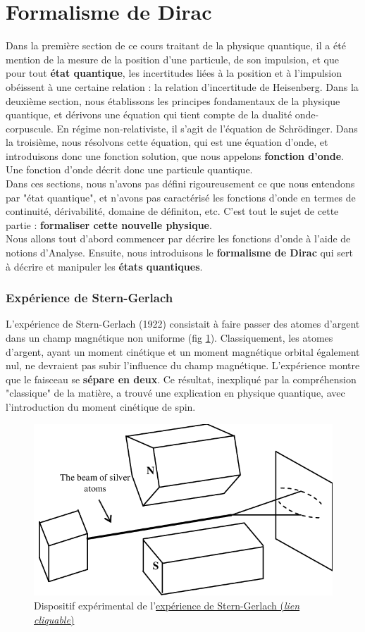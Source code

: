 \documentclass[../notesdecours.tex]{subfiles}
\begin{document}
\part{Formalisme de Dirac} \label{Formalisme de Dirac}
Dans la première section de ce cours traitant de la physique quantique, il a été mention de la mesure de la position d'une particule, de son impulsion, et que pour tout \textbf{état quantique}, les incertitudes liées à la position et à l'impulsion obéissent à une certaine relation : la relation d'incertitude de Heisenberg. Dans la deuxième section, nous établissons les principes fondamentaux de la physique quantique, et dérivons une équation qui tient compte de la dualité onde-corpuscule. En régime non-relativiste, il s'agit de l'équation de Schrödinger. Dans la troisième, nous résolvons cette équation, qui est une équation d'onde, et introduisons donc une fonction solution, que nous appelons \textbf{fonction d'onde}. Une fonction d'onde décrit donc une particule quantique. \\

Dans ces sections, nous n'avons pas défini rigoureusement ce que nous entendons par "état quantique", et n'avons pas caractérisé les fonctions d'onde en termes de continuité, dérivabilité, domaine de définiton, etc. C'est tout le sujet de cette partie : \textbf{formaliser cette nouvelle physique}. \\

Nous allons tout d'abord commencer par décrire les fonctions d'onde à l'aide de notions d'Analyse. Ensuite, nous introduisons le \textbf{formalisme de Dirac} qui sert à décrire et manipuler les \textbf{états quantiques}.
\section{Expérience de Stern-Gerlach}
L'expérience de Stern-Gerlach (1922) consistait à faire passer des atomes d'argent dans un champ magnétique non uniforme (fig \ref{fig:chap4-sterngerlach}). Classiquement, les atomes d'argent, ayant un moment cinétique et un moment magnétique orbital également nul, ne devraient pas subir l'influence du champ magnétique. L'expérience montre que le faisceau se \textbf{sépare en deux}. Ce résultat, inexpliqué par la compréhension "classique" de la matière, a trouvé une explication en physique quantique, avec l'introduction du moment cinétique de spin.\\

\begin{figure}[h]
\centering
\includegraphics[width=0.5\linewidth]{Stern-Gerlach}
\caption{Dispositif expérimental de l'\href{https://fr.wikipedia.org/wiki/Expérience_de_Stern_et_Gerlach}{expérience de Stern-Gerlach (\textit{lien cliquable})}}
\label{fig:chap4-sterngerlach}
\end{figure}
\end{document}
